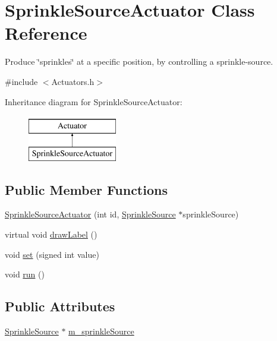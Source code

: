 \hypertarget{classSprinkleSourceActuator}{\section{Sprinkle\-Source\-Actuator Class Reference}
\label{classSprinkleSourceActuator}
}


Produce \char`\"{}sprinkles\char`\"{} at a specific position, by controlling a sprinkle-\/source.  




{\ttfamily \#include $<$Actuators.\-h$>$}

Inheritance diagram for Sprinkle\-Source\-Actuator\-:\begin{figure}[H]
\begin{center}
\leavevmode
\includegraphics[height=2.000000cm]{classSprinkleSourceActuator}
\end{center}
\end{figure}
\subsection*{Public Member Functions}
\begin{DoxyCompactItemize}
\item 
\hyperlink{classSprinkleSourceActuator_ad5c37f4cec656b8c7709f26e11ecd7a1}{Sprinkle\-Source\-Actuator} (int id, \hyperlink{classSprinkleSource}{Sprinkle\-Source} $\ast$sprinkle\-Source)
\item 
virtual void \hyperlink{classSprinkleSourceActuator_ad61ef520615f3ad27964c9388da99825}{draw\-Label} ()
\item 
void \hyperlink{classSprinkleSourceActuator_a273206caefb1bfa72320f7b096a004ed}{set} (signed int value)
\item 
void \hyperlink{classSprinkleSourceActuator_a92ea18d960f132ec493d3b0400a0c504}{run} ()
\end{DoxyCompactItemize}
\subsection*{Public Attributes}
\begin{DoxyCompactItemize}
\item 
\hyperlink{classSprinkleSource}{Sprinkle\-Source} $\ast$ \hyperlink{classSprinkleSourceActuator_a796daa80fb757c0db169b92c13f8d836}{m\-\_\-sprinkle\-Source}
\end{DoxyCompactItemize}


